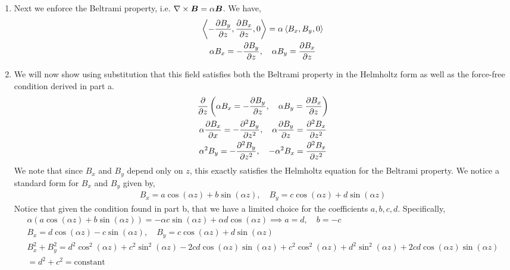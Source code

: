 \documentclass{article}
\begin{document}
\begin{enumerate}[label=\alph*.)]
    \item Next we enforce the Beltrami property, i.e. $\nabla\times\boldsymbol{B} =
    \alpha\boldsymbol{B}$. We have, 
    \begin{gather*}
        \left< -\frac{\partial B_y}{\partial z}, \frac{\partial B_x}{\partial z}, 0\right> = \alpha\left<B_x, B_y,
        0\right>\\
        \alpha B_x = - \frac{\partial B_y}{\partial z}, \quad \alpha B_y = \frac{\partial B_x}{\partial z}
    \end{gather*}
    \item  We will now show using substitution that this field satisfies both
    the Beltrami property in the Helmholtz form as well as the force-free
    condition derived in part a. 
    \begin{gather*}
        \frac{\partial }{\partial z}\left(\alpha B_x = - \frac{\partial B_y}{\partial z}, \quad \alpha B_y =
        \frac{\partial B_x}{\partial z}\right)\\
        \alpha\frac{\partial B_x}{\partial x} = -\frac{\partial^2 B_y}{\partial z^2}, \quad \alpha\frac{\partial B_y}{\partial z} =
        \frac{\partial^2 B_x}{\partial z^2}\\
        \alpha^2 B_y = -\frac{\partial^2 B_y}{\partial z^2}, \quad -\alpha^2 B_x =
        \frac{\partial^2 B_x}{\partial z^2}
    \end{gather*}
    We note that since $B_x$ and $B_y$ depend only on $z$, this exactly
    satisfies the Helmholtz equation for the Beltrami property. We notice a
    standard form for $B_x$ and $B_y$ given by,
    \begin{gather*}
        B_x = a\cos(\alpha z) + b\sin(\alpha z), \quad  B_y = c\cos(\alpha z) +
        d\sin(\alpha z)
    \end{gather*}
    Notice that given the condition found in part b, that we have a limited
    choice for the coefficients $a, b, c, d$. Specifically, 
    \begin{gather*}
        \alpha\left(a\cos(\alpha z) + b\sin(\alpha z)\right) = -\alpha c\sin(\alpha z) +
        \alpha d\cos(\alpha z) \implies a = d, \quad b = -c\\
        B_x = d\cos(\alpha z) - c\sin(\alpha z), \quad  B_y = c\cos(\alpha z) +
        d\sin(\alpha z)\\
        B_x^2 + B_y^2 = d^2\cos^2(\alpha z) + c^2\sin^2(\alpha z) -
        2cd\cos(\alpha z)\sin(\alpha z) + c^2\cos^2(\alpha z) + d^2\sin^2(\alpha z) +
        2cd\cos(\alpha z)\sin(\alpha z)\\
         = d^2 + c^2 = \text{constant}
    \end{gather*}
\end{enumerate}
\end{document}
